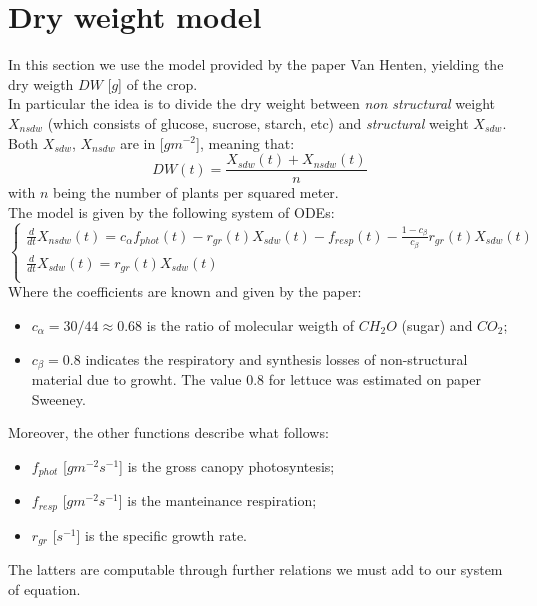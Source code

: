 \section{Dry weight model}
	
In this section we use the model provided by the paper Van Henten, yielding the dry weigth $DW$ [$g$] of the crop.\\
In particular the idea is to divide the dry weight between \emph{non structural} weight $X_{nsdw}$ (which consists of glucose, sucrose, starch, etc) and \emph{structural} weight $X_{sdw}$.\\
Both $X_{sdw}$, $X_{nsdw}$ are in [$gm^{-2}$], meaning that:
\begin{equation*} \label{DW}
	DW(t) = \frac{ X_{sdw}(t) + X_{nsdw}(t) }{n}
\end{equation*}
with $n$ being the number of plants per squared meter.
\\
The model is given by the following system of ODEs:
\begin{equation} \label{van henten model}
	\begin{cases}
		\frac{d}{dt}X_{nsdw}(t) = c_\alpha f_{phot}(t) - r_{gr}(t)X_{sdw}(t) - f_{resp}(t) - \frac{1-c_\beta}{c_\beta}r_{gr}(t)X_{sdw}(t) \\
		\frac{d}{dt}X_{sdw}(t) = r_{gr}(t)X_{sdw}(t)\\
	\end{cases}
\end{equation}
Where the coefficients are known and given by the paper:
\begin{itemize}
	\item $c_\alpha=30/44\approx{0.68}$ is the ratio of molecular weigth of $CH_2O$ (sugar) and $CO_2$;
	\item $c_\beta=0.8$ indicates the respiratory and synthesis losses of non-structural material due to growht. The value $0.8$ for lettuce was estimated on paper Sweeney.
\end{itemize}
Moreover, the other functions describe what follows:
\begin{itemize}
	\item $f_{phot}$ [$gm^{-2}s^{-1}$] is the gross canopy photosyntesis;
	\item $f_{resp}$ [$gm^{-2}s^{-1}$] is the manteinance respiration;
	\item $r_{gr}$ [$s^{-1}$] is the specific growth rate.
\end{itemize}
The latters are computable through further relations we must add to our system of equation.

